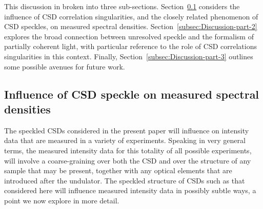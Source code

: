 \documentclass{iucr}              %
\begin{document}
This discussion in broken into three sub-sections.  Section~\ref{subsec:Discussion-part-1} considers the influence of CSD correlation singularities, and the closely related phenomenon of CSD speckles, on measured spectral densities.  Section~\ref{subsec:Discussion-part-2} explores the broad connection between unresolved speckle and the formalism of partially coherent light, with particular reference to the role of CSD correlations singularities in this context.  Finally, Section~\ref{subsec:Discussion-part-3} outlines some possible avenues for future work.  

\subsection{Influence of CSD speckle on measured spectral densities}\label{subsec:Discussion-part-1}

The speckled CSDs considered in the present paper will influence on intensity data that are measured in a variety of experiments.  Speaking in very general terms, the measured intensity data for this totality of all possible experiments, will involve a coarse-graining over both the CSD and over the structure of any sample that may be present, together with any optical elements that are introduced after the undulator.  The speckled structure of CSDs such as that considered here will influence measured intensity data in possibly subtle ways, a point we now explore in more detail.  
\end{document}
